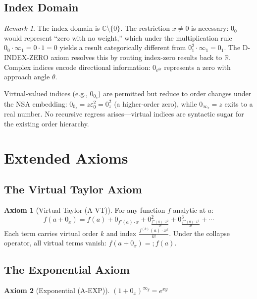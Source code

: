 \documentclass[12pt]{article}
\theoremstyle{definition}
\newtheorem{axiom}{Axiom}
\theoremstyle{remark}
\newtheorem{remark}[theorem]{Remark}
\newcommand{\vz}[1]{0_{#1}}             %
\newcommand{\vi}[1]{\infty_{#1}}        %
\newcommand{\vzn}[2]{0^{#1}_{#2}}       %
\newcommand{\ceq}{\mathrel{=\!\!;}}     %
\newcommand{\R}{\mathbb{R}}
\newcommand{\C}{\mathbb{C}}
\begin{document}
\subsection{Index Domain}

\begin{remark}
The index domain is $\C \setminus \{0\}$. The restriction $x \neq 0$ is
necessary: $\vz{0}$ would represent ``zero with no weight,'' which under
the multiplication rule $\vz{0} \cdot \vi{1} = 0 \cdot 1 = 0$ yields a
result categorically different from $\vzn{2}{1} \cdot \vi{1} = \vz{1}$.
The D-INDEX-ZERO axiom resolves this by routing index-zero results back to
$\R$. Complex indices encode directional information: $0_{e^{i\theta}}$
represents a zero with approach angle $\theta$.

Virtual-valued indices (e.g., $0_{0_z}$) are permitted but reduce to
order changes under the NSA embedding: $0_{0_z} = z\varepsilon_0^2 =
0^2_z$ (a higher-order zero), while $0_{\infty_z} = z$ exits to a real
number. No recursive regress arises---virtual indices are syntactic sugar
for the existing order hierarchy.
\end{remark}


\section{Extended Axioms}
\label{sec:extended}

\subsection{The Virtual Taylor Axiom}

\begin{axiom}[Virtual Taylor (A-VT)]
\label{ax:vt}
For any function $f$ analytic at $a$:
\[
f(a + \vz{x}) = f(a) + \vz{f'(a) \cdot x}
  + \vzn{2}{\frac{f''(a) \cdot x^2}{2!}}
  + \vzn{3}{\frac{f'''(a) \cdot x^3}{3!}} + \cdots
\]
Each term carries virtual order $k$ and index $\frac{f^{(k)}(a) \cdot x^k}{k!}$.
Under the collapse operator, all virtual terms vanish: $f(a + \vz{x}) \ceq f(a)$.
\end{axiom}

\subsection{The Exponential Axiom}

\begin{axiom}[Exponential (A-EXP)]
\label{ax:exp}
$(1 + \vz{x})^{\vi{y}} = e^{xy}$
\end{axiom}
\end{document}
